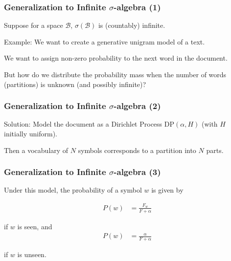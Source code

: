 \documentclass[12pt]{beamer}
\begin{document}
\begin{frame}
    \frametitle{Generalization to Infinite $\sigma$-algebra (1)}

    Suppose for a space $\mathcal{B}$, $\sigma(\mathcal{B})$ is (countably)
    infinite.

    \bigskip

    \pause
    
    \alert{Example:} 
    We want to create a generative unigram model of a text.

    \bigskip

    \pause
    
    We want to assign non-zero probability to the next word in the document.

    \bigskip

    \pause

    But how do we distribute the probability mass when the number of words
    (partitions) is unknown (and possibly infinite)?

\end{frame}



\begin{frame}
    \frametitle{Generalization to Infinite $\sigma$-algebra (2)}

    \alert{Solution:}
    Model the document as a Dirichlet Process DP$(\alpha, H)$
    (with $H$ initially uniform).

    \bigskip
    
    Then a vocabulary of $N$ symbols corresponds to a partition into $N$ parts.

\end{frame}



\begin{frame}
    \frametitle{Generalization to Infinite $\sigma$-algebra (3)}
    
    Under this model, the probability of a symbol $w$
    is given by

    \begin{align*}
        P(w)
        &=
        \frac{F_w}{F + \alpha}
    \end{align*}

    if $w$ is seen, and 
    \begin{align*}
        P(w)
        &=
        \frac{\alpha}{F + \alpha}
    \end{align*}

    if $w$ is unseen.

\end{frame}
\end{document}
